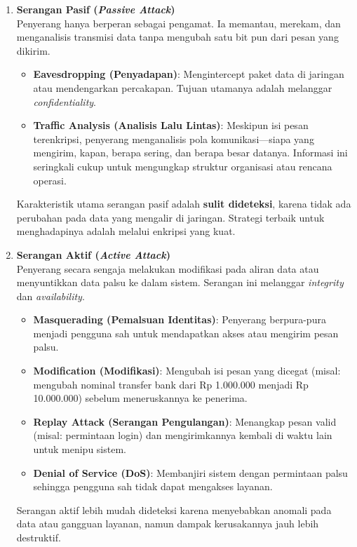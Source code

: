 \begin{enumerate}
    \item \textbf{Serangan Pasif (\textit{Passive Attack})} \\
    Penyerang hanya berperan sebagai pengamat. Ia memantau, merekam, dan menganalisis transmisi data tanpa mengubah satu bit pun dari pesan yang dikirim.
    \begin{itemize}
        \item \textbf{Eavesdropping (Penyadapan)}: Mengintercept paket data di jaringan atau mendengarkan percakapan. Tujuan utamanya adalah melanggar \textit{confidentiality}.
        \item \textbf{Traffic Analysis (Analisis Lalu Lintas)}: Meskipun isi pesan terenkripsi, penyerang menganalisis pola komunikasi—siapa yang mengirim, kapan, berapa sering, dan berapa besar datanya. Informasi ini seringkali cukup untuk mengungkap struktur organisasi atau rencana operasi.
    \end{itemize}
    Karakteristik utama serangan pasif adalah \textbf{sulit dideteksi}, karena tidak ada perubahan pada data yang mengalir di jaringan. Strategi terbaik untuk menghadapinya adalah melalui enkripsi yang kuat.

    \item \textbf{Serangan Aktif (\textit{Active Attack})} \\
    Penyerang secara sengaja melakukan modifikasi pada aliran data atau menyuntikkan data palsu ke dalam sistem. Serangan ini melanggar \textit{integrity} dan \textit{availability}.
    \begin{itemize}
        \item \textbf{Masquerading (Pemalsuan Identitas)}: Penyerang berpura-pura menjadi pengguna sah untuk mendapatkan akses atau mengirim pesan palsu.
        \item \textbf{Modification (Modifikasi)}: Mengubah isi pesan yang dicegat (misal: mengubah nominal transfer bank dari Rp 1.000.000 menjadi Rp 10.000.000) sebelum meneruskannya ke penerima.
        \item \textbf{Replay Attack (Serangan Pengulangan)}: Menangkap pesan valid (misal: permintaan login) dan mengirimkannya kembali di waktu lain untuk menipu sistem.
        \item \textbf{Denial of Service (DoS)}: Membanjiri sistem dengan permintaan palsu sehingga pengguna sah tidak dapat mengakses layanan.
    \end{itemize}
    Serangan aktif lebih mudah dideteksi karena menyebabkan anomali pada data atau gangguan layanan, namun dampak kerusakannya jauh lebih destruktif.
\end{enumerate}

